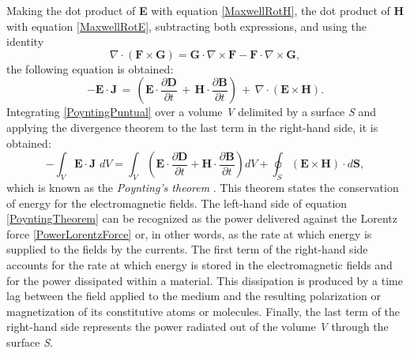 Making the dot product of \textbf{E} with equation \eqref{MaxwellRotH}, the dot product of \textbf{H} with
equation \eqref{MaxwellRotE}, subtracting both expressions, and using the identity
\begin{equation}
	\nabla\cdot\left(\mathbf{F}\times\mathbf{G}\right) = \mathbf{G}\cdot\nabla\times\mathbf{F} - \mathbf{F}\cdot\nabla\times\mathbf{G},
\end{equation}
the following equation is obtained:
\begin{equation}\label{PoyntingPuntual}
    -\mathbf{E}\cdot\mathbf{J}\,=\,\left(\mathbf{E}\cdot\frac{\partial\mathbf{D}}{\partial t}\,+\,\mathbf{H}\cdot\frac{\partial\mathbf{B}}{\partial t}\right)\,+\,\nabla\cdot\left(\mathbf{E}\times\mathbf{H}\right).
\end{equation}
Integrating \eqref{PoyntingPuntual} over a volume \emph{V} delimited by a surface \emph{S} and applying the divergence theorem to the last term in the right-hand side, it is obtained:
\begin{equation}\label{PoyntingTheorem}
    - \int_{V} \mathbf{E}\cdot\mathbf{J}\,\,dV = \int_{V} \left(\mathbf{E}\cdot\frac{\partial\mathbf{D}}{\partial t} + \mathbf{H}\cdot\frac{\partial\mathbf{B}}{\partial t}\right) dV + \oint_{S} \left(\mathbf{E}\times\mathbf{H}\right)\cdot d\mathbf{S},
\end{equation}
which is known as the \emph{Poynting's theorem} \cite{Poynting}. This theorem states the conservation of energy for the electromagnetic fields. The left-hand side of equation \eqref{PoyntingTheorem} can be recognized as the power delivered against the Lorentz force \eqref{PowerLorentzForce} or, in other words, as the rate at which energy is supplied to the fields by the currents. The first term of the right-hand side accounts for the rate at which energy is stored in the electromagnetic fields and for the power dissipated within a material. This dissipation is produced by a time lag between the field applied to the medium and the resulting polarization or magnetization of its constitutive atoms or molecules. Finally, the last term of the right-hand side represents the power radiated out of the volume \emph{V} through the surface \emph{S}.

